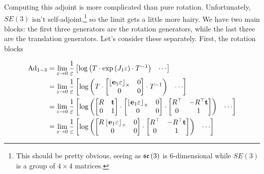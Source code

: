 Computing this adjoint is more complicated than pure rotation. Unfortunately,
$SE(3)$ isn't self-adjoint,\footnote{This should be pretty obvious, seeing as $\mathfrak{se}\left(3\right)$ is 6-dimensional
while $SE(3)$ is a group of $4\times4$ matrices.} so the limit gets a little more hairy. We have two main blocks: the
first three generators are the rotation generators, while the last
three are the translation generators. Let's consider these separately.
First, the rotation blocks

\begin{align*}
\Ad_{1-3} & =\lim_{\varepsilon\to0}\frac{1}{\varepsilon}\begin{bmatrix}\log\left(T\cdot\exp\left(J_{1}\varepsilon\right)\cdot T^{-1}\right) & \cdots\end{bmatrix}\\
 & =\lim_{\varepsilon\to0}\frac{1}{\varepsilon}\begin{bmatrix}\log\left(T\cdot\begin{bmatrix}\ss{\ebf_{1}\varepsilon} & 0\\
0 & 0
\end{bmatrix}\cdot T^{-1}\right) & \cdots\end{bmatrix}\\
 & =\lim_{\varepsilon\to0}\frac{1}{\varepsilon}\begin{bmatrix}\log\left(\begin{bmatrix}R & \tbf\\
0 & 1
\end{bmatrix}\cdot\begin{bmatrix}\ss{\ebf_{1}\varepsilon} & 0\\
0 & 0
\end{bmatrix}\cdot\begin{bmatrix}R^{\top} & -R^{\top}\tbf\\
0 & 1
\end{bmatrix}\right) & \cdots\end{bmatrix}\\
 & =\lim_{\varepsilon\to0}\frac{1}{\varepsilon}\begin{bmatrix}\log\left(\begin{bmatrix}R\ss{\ebf_{1}\varepsilon} & 0\\
0 & 0
\end{bmatrix}\cdot\begin{bmatrix}R^{\top} & -R^{\top}\tbf\\
0 & 1
\end{bmatrix}\right) & \cdots\end{bmatrix}\\

\end{align*}
